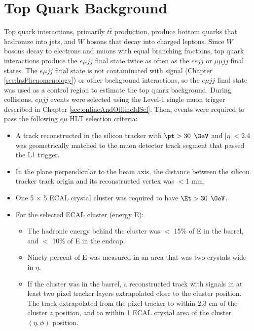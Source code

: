 \section{Top Quark Background}
\label{sec:topQrkBkgnds}
Top quark interactions, primarily $t\bar{t}$ production, produce bottom quarks that hadronize into jets, and $W$ bosons that 
decay into charged leptons.  Since $W$ bosons decay to electrons and muons with equal branching fractions, top quark interactions 
produce the $e\mu jj$ final state twice as often as the $eejj$ or $\mu\mu jj$ final states.  The $e\mu jj$ final state is not 
contaminated with \WR signal (Chapter \ref{sec:lrsPhenomenology}) or other background interactions, so the $e\mu jj$ final state was 
used as a control region to estimate the top quark background.  During collisions, $e\mu jj$ events were selected using the 
Level-1 single muon trigger described in Chapter \ref{sec:onlineAndOfflineIdSel}.  Then, events were required to pass the following 
$e\mu$ HLT selection criteria:

\begin{itemize}
	\item A track reconstructed in the silicon tracker with $\pt > 30$ $\GeV$ and $|\eta| < 2.4$ was geometrically matched to 
		the muon detector track segment that passed the L1 trigger.
	\item In the plane perpendicular to the beam axis, the distance between the silicon tracker track origin and its 
		reconstructed vertex was $< 1$ mm.
	\item One 5 $\times$ 5 ECAL crystal cluster was required to have $\Et > 30$ $\GeV$.
	\item For the selected ECAL cluster (energy E):
	\begin{itemize}
		\item The hadronic energy behind the cluster was $<$ 15\% of E in the barrel, and $<$ 10\% of E in the endcap. 
		\item Ninety percent of E was measured in an area that was two crystals wide in $\eta$.
		\item If the cluster was in the barrel, a reconstructed track with signals in at least two pixel tracker layers 
			extrapolated close to the cluster position.  The track extrapolated from the pixel tracker to within $2.3$ cm 
			of the cluster $z$ position, and to within 1 ECAL crystal area of the cluster $(\eta,\phi)$ position.
	\end{itemize}
\end{itemize}

